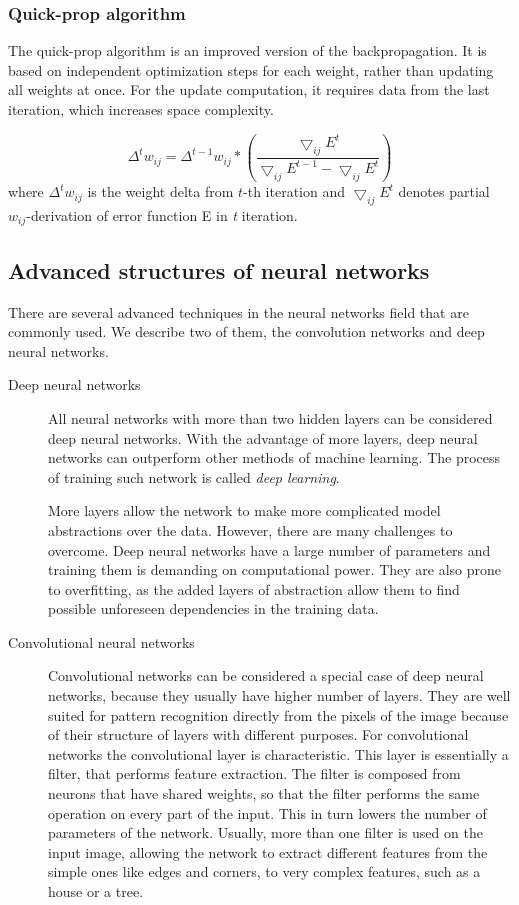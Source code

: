 \subsubsection{Quick-prop algorithm}
The quick-prop algorithm is an improved version of the backpropagation. It is based on independent optimization steps for each weight, rather than updating all weights at once. For the update computation, it requires data from the last iteration, which increases space complexity. 

\[
\Delta ^{t} w_{ij} = \Delta^{t-1} w_{ij}*(\frac {\bigtriangledown_{ij} E^{t}} {\bigtriangledown_{ij} E^{t-1} - \bigtriangledown_{ij} E^{t}})
\]
where $\Delta ^{t} w_{ij}$ is the weight delta from $t$-th iteration and $\bigtriangledown_{ij} E^{t}$ denotes partial $w_{ij}$-derivation of error function E in \emph{t} iteration.

\subsection{Advanced structures of neural networks}
There are several advanced techniques in the neural networks field that are commonly used. We describe two of them, the convolution networks and deep neural networks.

\begin{description}
\item [Deep neural networks]
All neural networks with more than two hidden layers can be considered deep neural networks. With the advantage of more layers, deep neural networks can outperform other methods of machine learning. The process of training such network is called \emph{deep learning}. 

More layers allow the network to make more complicated model abstractions over the data. However, there are many challenges to overcome. Deep neural networks have a large number of parameters and training them is demanding on computational power. They are also prone to overfitting, as the added layers of abstraction allow them to find possible unforeseen dependencies in the training data.

\item [Convolutional neural networks]
Convolutional networks can be considered a special case of deep neural networks, because they usually have higher number of layers. They are well suited for pattern recognition directly from the pixels of the image because of their structure of layers with different purposes.
For convolutional networks the convolutional layer is characteristic. This layer is essentially a filter, that performs feature extraction. The filter is composed from neurons that have shared weights, so that the filter performs the same operation on every part of the input. This in turn lowers the number of parameters of the network. Usually, more than one filter is used on the input image, allowing the network to extract different features from the simple ones like edges and corners, to very complex features, such as a house or a tree.
\end{description}


